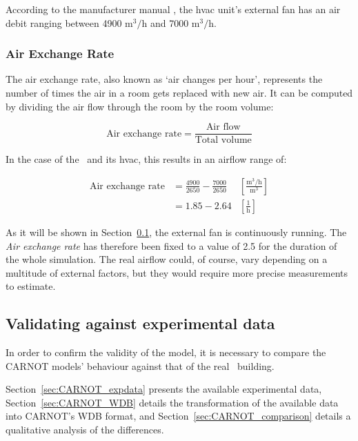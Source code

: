 According to the manufacturer manual \cite{aermecRoofTopManuelSelection}, the
\acrshort{hvac} unit's external fan has an air debit ranging between 4900
$\text{m}^3/\text{h}$ and 7000 $\text{m}^3/\text{h}$.

\subsubsection*{Air Exchange Rate}\label{sec:Air_Exchange_Rate}

The air exchange rate, also known as `air changes per hour', represents the
number of times the air in a room gets replaced with new air. It can be
computed by dividing the air flow through the room by the room volume:

\begin{equation}
    \text{Air exchange rate} = \frac{\text{Air flow}}{\text{Total volume}}
\end{equation}

In the case of the \pdome\ and its \acrshort{hvac}, this results in an airflow
range of:

\begin{equation}
    \begin{aligned}
        \text{Air exchange rate} &= \frac{4900}{2650} 
        - \frac{7000}{2650} &\left[\frac{\text{m}^3/\text{h}}{\text{m}^3}\right]\\
                            &= 1.85 - 2.64 &\left[\frac{1}{\text{h}}\right]
    \end{aligned}
\end{equation}

As it will be shown in Section~\ref{sec:CARNOT_experimental}, the external fan
is continuously running. The \textit{Air exchange rate} has therefore been fixed
to a value of 2.5 for the duration of the whole simulation. The real airflow
could, of course, vary depending on a multitude of external factors, but they
would require more precise measurements to estimate.

\subsection{Validating against experimental data}\label{sec:CARNOT_experimental}

In order to confirm the validity of the model, it is necessary to compare the
CARNOT models' behaviour against that of the real \pdome\ building.

Section~\ref{sec:CARNOT_expdata} presents the available experimental data,
Section~\ref{sec:CARNOT_WDB} details the transformation of the available data
into CARNOT's WDB format, and Section~\ref{sec:CARNOT_comparison} details a
qualitative analysis of the differences.

